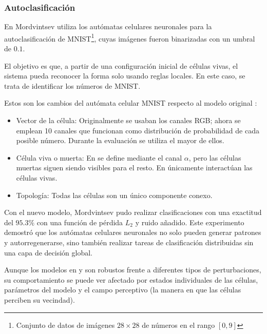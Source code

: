 \subsubsection{Autoclasificación}

En \cite{mordvintsev2020_mnist} Mordvintsev utiliza los autómatas celulares neuronales para la autoclasificación de MNIST\footnote{Conjunto de datos de imágenes $28 \times 28$ de números en el rango $[0,9]$}, cuyas imágenes fueron binarizadas con un umbral de $0.1$. 

El objetivo es que, a partir de una configuración inicial de células vivas, el sistema pueda reconocer la forma solo usando reglas locales. En este caso, se trata de identificar los números de MNIST.

Estos son los cambios del autómata celular MNIST respecto al modelo original \cite{mordvintsev2020_nca}:

\begin{itemize}
	
	\item Vector de la célula: Originalmente se usaban los canales RGB; ahora se emplean 10 canales que funcionan como distribución de probabilidad de cada posible número. Durante la evaluación se utiliza el mayor de ellos.
	
	\item Célula viva o muerta: En \cite{mordvintsev2020_nca} se define mediante el canal $\alpha$, pero las células muertas siguen siendo visibles para el resto. En \cite{mordvintsev2020_mnist} únicamente interactúan las células vivas.
	
	\item Topología: Todas las células son un único componente conexo.
\end{itemize}

Con el nuevo modelo, Mordvintsev pudo realizar clasificaciones con una exactitud del $95.3\%$ con una función de pérdida $L_2$ y ruido añadido. Este experimento demostró que los autómatas celulares neuronales no solo pueden generar patrones y autorregenerarse, sino también realizar tareas de clasificación distribuidas sin una capa de decisión global.

Aunque los modelos en \cite{mordvintsev2020_nca} y \cite{mordvintsev2020_mnist} son robustos frente a diferentes tipos de perturbaciones, su comportamiento se puede ver afectado por estados individuales de las células, parámetros del modelo y el campo perceptivo (la manera en que las células perciben su vecindad).


